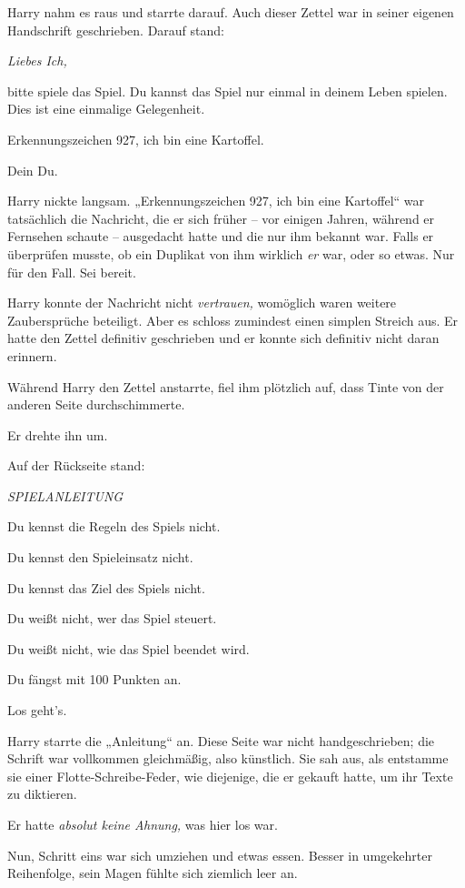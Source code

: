 {Harry nahm es raus und starrte darauf. Auch dieser Zettel war in seiner eigenen Handschrift geschrieben. Darauf stand:

\emph{Liebes Ich,}

bitte spiele das Spiel. Du kannst das Spiel nur einmal in deinem Leben spielen. Dies ist eine einmalige Gelegenheit.

Erkennungszeichen 927, ich bin eine Kartoffel.

Dein Du.

Harry nickte langsam. „Erkennungszeichen 927, ich bin eine Kartoffel“ war tatsächlich die Nachricht, die er sich früher -- vor einigen Jahren, während er Fernsehen schaute -- ausgedacht hatte und die nur ihm bekannt war. Falls er überprüfen musste, ob ein Duplikat von ihm wirklich \emph{er} war, oder so etwas. Nur für den Fall. Sei bereit.

Harry konnte der Nachricht nicht \emph{vertrauen,} womöglich waren weitere Zaubersprüche beteiligt. Aber es schloss zumindest einen simplen Streich aus. Er hatte den Zettel definitiv geschrieben und er konnte sich definitiv nicht daran erinnern.

Während Harry den Zettel anstarrte, fiel ihm plötzlich auf, dass Tinte von der anderen Seite durchschimmerte.

Er drehte ihn um.

Auf der Rückseite stand:

\emph{SPIELANLEITUNG}

Du kennst die Regeln des Spiels nicht.

Du kennst den Spieleinsatz nicht.

Du kennst das Ziel des Spiels nicht.

Du weißt nicht, wer das Spiel steuert.

Du weißt nicht, wie das Spiel beendet wird.

Du fängst mit 100 Punkten an.

Los geht's.

Harry starrte die „Anleitung“ an. Diese Seite war nicht handgeschrieben; die Schrift war vollkommen gleichmäßig, also künstlich. Sie sah aus, als entstamme sie einer Flotte-Schreibe-Feder, wie diejenige, die er gekauft hatte, um ihr Texte zu diktieren.

Er hatte \emph{absolut keine Ahnung,} was hier los war.

Nun, Schritt eins war sich umziehen und etwas essen. Besser in umgekehrter Reihenfolge, sein Magen fühlte sich ziemlich leer an.

}
